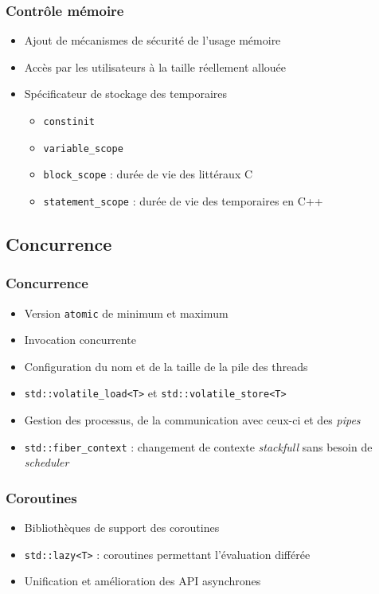 \documentclass[C++.tex]{subfiles}
\begin{document}
\begin{frame}[fragile]
	\frametitle{Contrôle mémoire}
	\begin{itemize}
		\item Ajout de mécanismes de sécurité de l'usage mémoire


		\item Accès par les utilisateurs à la taille réellement allouée
		\item Spécificateur de stockage des temporaires 
		\begin{itemize}
			\item \lstinline|constinit|
			\item \lstinline|variable_scope|
			\item \lstinline|block_scope| : durée de vie des littéraux C
			\item \lstinline|statement_scope| : durée de vie des temporaires en C++
		\end{itemize}
	\end{itemize}
\end{frame}

\subsection*{Concurrence}
\begin{frame}[fragile]
	\frametitle{Concurrence}
	\begin{itemize}
		\item Version \lstinline|atomic| de minimum et maximum
		\item Invocation concurrente
		\item Configuration du nom et de la taille de la pile des threads
		\item \lstinline|std::volatile_load<T>| et \lstinline|std::volatile_store<T>|
		\item Gestion des processus, de la communication avec ceux-ci et des \textit{pipes}
		\item \lstinline|std::fiber_context| : changement de contexte \textit{stackfull} sans besoin de \textit{scheduler}
	\end{itemize}
\end{frame}

\begin{frame}[fragile]
	\frametitle{Coroutines}
	\begin{itemize}
		\item Bibliothèques de support des coroutines
		\item \lstinline|std::lazy<T>| : coroutines permettant l'évaluation différée
		\item Unification et amélioration des API asynchrones

	\end{itemize}
\end{frame}
\end{document}
